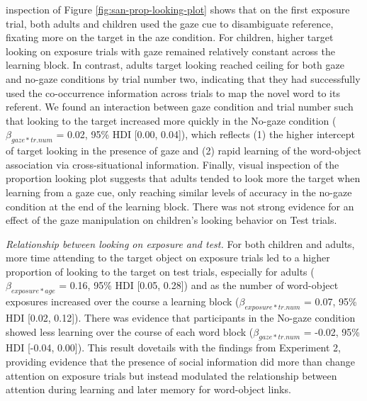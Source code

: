 \documentclass[oneside]{report}
\begin{document}
inspection of Figure \ref{fig:san-prop-looking-plot} shows that on the
first exposure trial, both adults and children used the gaze cue to
disambiguate reference, fixating more on the target in the aze
condition. For children, higher target looking on exposure trials with
gaze remained relatively constant across the learning block. In
contrast, adults target looking reached ceiling for both gaze and
no-gaze conditions by trial number two, indicating that they had
successfully used the co-occurrence information across trials to map the
novel word to its referent. We found an interaction between gaze
condition and trial number such that looking to the target increased
more quickly in the No-gaze condition (\(\beta_{gaze*tr.num}\) = 0.02,
95\% HDI {[}0.00, 0.04{]}), which reflects (1) the higher intercept of
target looking in the presence of gaze and (2) rapid learning of the
word-object association via cross-situational information. Finally,
visual inspection of the proportion looking plot suggests that adults
tended to look more the target when learning from a gaze cue, only
reaching similar levels of accuracy in the no-gaze condition at the end
of the learning block. There was not strong evidence for an effect of
the gaze manipulation on children's looking behavior on Test trials.

\emph{Relationship between looking on exposure and test.} For both
children and adults, more time attending to the target object on
exposure trials led to a higher proportion of looking to the target on
test trials, especially for adults (\(\beta_{exposure*age}\) = 0.16,
95\% HDI {[}0.05, 0.28{]}) and as the number of word-object exposures
increased over the course a learning block (\(\beta_{exposure*tr.num}\)
= 0.07, 95\% HDI {[}0.02, 0.12{]}). There was evidence that participants
in the No-gaze condition showed less learning over the course of each
word block (\(\beta_{gaze*tr.num}\) = -0.02, 95\% HDI {[}-0.04,
0.00{]}). This result dovetails with the findings from Experiment 2,
providing evidence that the presence of social information did more than
change attention on exposure trials but instead modulated the
relationship between attention during learning and later memory for
word-object links.
\end{document}

